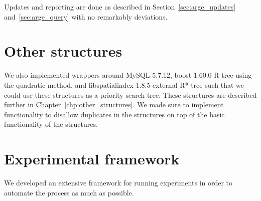 \documentclass[twoside,11pt,openright]{report}
\begin{document}
Updates and reporting are done as described in Section~\ref{sec:arge_updates} and~\ref{sec:arge_query} with no remarkably deviations.

\section{Other structures}
We also implemented wrappers around MySQL 5.7.12, boost 1.60.0 R-tree using the quadratic method, and libspatialindex 1.8.5 external R*-tree such that we could use these structures as a priority search tree. These structures are described further in Chapter~\ref{chp:other_structures}. We made sure to implement functionality to disallow duplicates in the structures on top of the basic functionality of the structures.

\section{Experimental framework}
We developed an extensive framework for running experiments in order to automate the process as much as possible.
\end{document}
